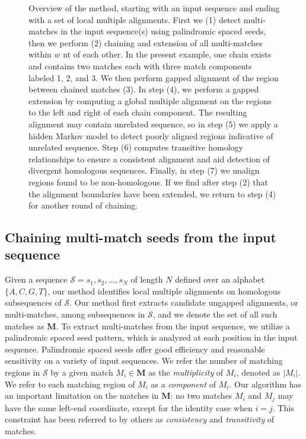 \documentclass{llncs}
\begin{document}
\begin{figure}[p]
\begin{center}
\end{center}
\caption{Overview of the method, starting with an input sequence and ending
with a set of local multiple alignments. First we (1) detect
multi-matches in the input sequence(s) using palindromic spaced seeds,
then we perform (2) chaining and extension of all multi-matches within
$w$ nt of each other.  In the present example, one chain exists and
contains two matches each with three match components labeled 1, 2,
and 3.  We then perform gapped alignment of the region between chained
matches (3).  In step (4), we perform a gapped extension by computing
a global multiple alignment on the regions to the left and right of
each chain component.  The resulting alignment may contain unrelated
sequence, so in step (5) we apply a hidden Markov model to detect
poorly aligned regions indicative of unrelated sequence.  Step (6)
computes transitive homology relationships to ensure a consistent
alignment and aid detection of divergent homologous sequences.
Finally, in step (7) we unalign regions found to be non-homologous.
If we find after step (2) that the alignment boundaries have been
extended, we return to step (4) for another round of chaining.}
\label{fig-main}
\end{figure}

\subsection{Chaining multi-match seeds from the input sequence}
Given a sequence $\mathcal{S}=s_1, s_2,\dots, s_N$ of length $N$
defined over an alphabet $\{A,C,G,T\}$, our method identifies
local multiple alignments on homologous subsequences of
$\mathcal{S}$. Our method first extracts candidate ungapped
alignments, or multi-matches, among subsequences in $\mathcal{S}$,
and we denote the set of all such matches as $\mathbf{M}$. To extract multi-matches from the input
sequence, we utilize a palindromic spaced seed pattern\cite{ref-zhang}, which is
analyzed at each position in the input sequence.
Palindromic spaced seeds offer good efficiency and
reasonable sensitivity on a variety of input
sequences\cite{ref-procrast}.  We refer the number of matching regions
in $\mathcal{S}$ by a given match $M_i \in \mathbf{M}$ as the
\textit{multiplicity} of $M_i$, denoted as $|M_i|$. We refer to each
matching region of $M_i$ as a \textit{component} of $M_i$. Our
algorithm has an important limitation on the matches in $\mathbf{M}$:
no two matches $M_i$ and $M_j$ may have the same left-end coordinate,
except for the identity case when $i=j$.  This constraint has been
referred to by others as \textit{consistency} and
\textit{transitivity}\cite{ref-transitivity} of matches.
\end{document}
